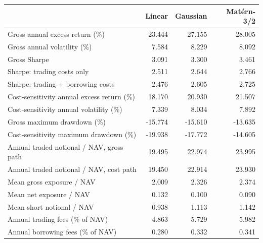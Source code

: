 \begin{tabular}{lrrr}
\toprule
 & Linear & Gaussian & Mat\'ern-3/2 \\
\midrule
Gross annual excess return (\%) & 23.444 & 27.155 & 28.005 \\
Gross annual volatility (\%) & 7.584 & 8.229 & 8.092 \\
Gross Sharpe & 3.091 & 3.300 & 3.461 \\
Sharpe: trading costs only & 2.511 & 2.644 & 2.766 \\
Sharpe: trading + borrowing costs & 2.476 & 2.605 & 2.725 \\
Cost-sensitivity annual excess return (\%) & 18.170 & 20.930 & 21.507 \\
Cost-sensitivity annual volatility (\%) & 7.339 & 8.034 & 7.892 \\
Gross maximum drawdown (\%) & -15.774 & -15.610 & -13.635 \\
Cost-sensitivity maximum drawdown (\%) & -19.938 & -17.772 & -14.605 \\
Annual traded notional / NAV, gross path & 19.495 & 22.974 & 23.995 \\
Annual traded notional / NAV, cost path & 19.450 & 22.914 & 23.930 \\
Mean gross exposure / NAV & 2.009 & 2.326 & 2.374 \\
Mean net exposure / NAV & 0.132 & 0.100 & 0.090 \\
Mean short notional / NAV & 0.938 & 1.113 & 1.142 \\
Annual trading fees (\% of NAV) & 4.863 & 5.729 & 5.982 \\
Annual borrowing fees (\% of NAV) & 0.280 & 0.332 & 0.341 \\
\bottomrule
\end{tabular}
